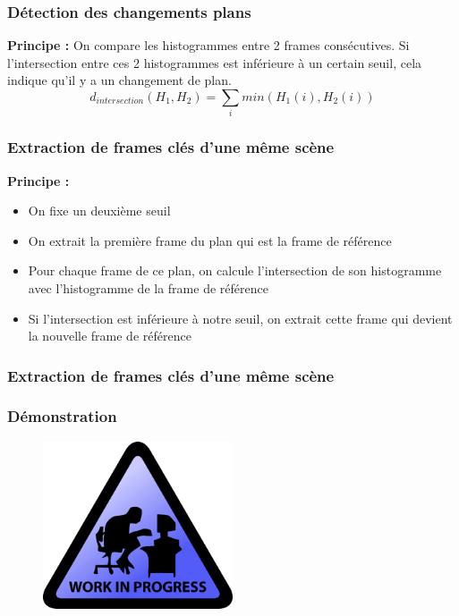  \begin{frame}
 \frametitle{Détection des changements plans}
 
 \textbf{Principe :} On compare les histogrammes entre 2 frames consécutives. Si l'intersection entre ces 2 histogrammes est inférieure à un certain seuil, cela indique qu'il y a un changement de plan. \\
 \[d_{intersection}(H_{1},H_{2}) = \sum_{i} min(H_{1}(i),H_{2}(i))\]
 
 \end{frame}
 
 
 \begin{frame}
 \frametitle{Extraction de frames clés d'une même scène}
 \textbf{Principe :}
\begin{itemize} 
\item{On fixe un deuxième seuil}
\item{On extrait la première frame du plan qui est la frame de référence}
\item{Pour chaque frame de ce plan, on calcule l'intersection de son histogramme avec l'histogramme de la frame de référence}
\item{Si l'intersection est inférieure à notre seuil, on extrait cette frame qui devient la nouvelle frame de référence}
\end{itemize}
\end{frame}

\begin{frame}
 \frametitle{Extraction de frames clés d'une même scène}
\end{frame}


 \begin{frame}
   \frametitle{Démonstration}
   \begin{figure}
   \includegraphics[width=0.5\textwidth]{Fig/workInProgress.png}
   \end{figure}

 \end{frame}
